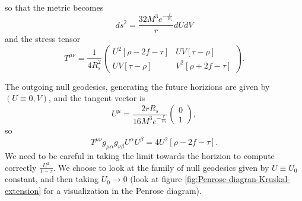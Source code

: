 so that the metric becomes
\[
    ds^2 = \frac{32M^3e^{-\frac{r}{R_s}}}{r}dUdV
\]
and the stress tensor
\[
    T^{\mu\nu} = \frac{1}{4R_s^2}
    \begin{pmatrix}
        U^2 \left[\rho - 2f - \tau \right] &
        UV\left[\tau - \rho\right] \\ 
        UV\left[\tau - \rho\right] &
        V^2 \left[\rho + 2f - \tau \right]
    \end{pmatrix}.
\]


The outgoing null geodesics, generating the future horizions are given by \((U \equiv 0, V)\), and the tangent vector is 
\[
U^{\mu} = \frac{2rR_s}{16M^3e^{-\frac{r}{R_s}}} \begin{pmatrix}
    0 \\ 1
\end{pmatrix},
\]
so
\[
   T^{\mu\nu}g_{\mu\alpha}g_{\nu\beta}U^{\alpha}U^{\beta}  = 
    4U^2\left[\rho - 2f - \tau \right].
\]
We need to be careful in taking the limit towards the horizion to compute correctly \(\frac{U^2}{1 - z}\). We choose to look at the family of null geodesics given by \(U \equiv U_0\) constant, and then taking \(U_0 \rightarrow 0\) (look at figure \ref{fig:Penrose-diagran-Kruskal-extension} for a visualization in the Penrose diagram). 


